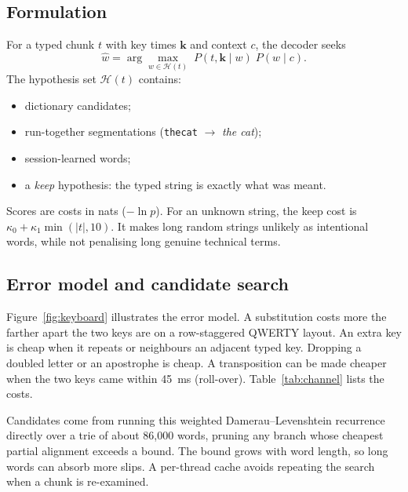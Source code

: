 \documentclass[11pt,a4paper]{article}
\newcommand{\ttw}[1]{\texttt{#1}}
\begin{document}
\subsection{Formulation}
For a typed chunk $t$ with key times $\mathbf{k}$ and context $c$, the decoder seeks
\begin{equation}
\hat{w} = \arg\max_{w \in \mathcal{H}(t)} \; P(t,\mathbf{k}\mid w)\; P(w \mid c).
\end{equation}
The hypothesis set $\mathcal{H}(t)$ contains:
\begin{itemize}
\item dictionary candidates;
\item run-together segmentations (\ttw{thecat} $\to$ \emph{the cat});
\item session-learned words;
\item a \emph{keep} hypothesis: the typed string is exactly what was meant.
\end{itemize}
Scores are costs in nats ($-\ln p$). For an unknown string, the keep cost is $\kappa_0 + \kappa_1\min(|t|,10)$. It makes long random strings unlikely as intentional words, while not penalising long genuine technical terms.

\subsection{Error model and candidate search}
Figure~\ref{fig:keyboard} illustrates the error model. A substitution costs more the farther apart the two keys are on a row-staggered QWERTY layout. An extra key is cheap when it repeats or neighbours an adjacent typed key. Dropping a doubled letter or an apostrophe is cheap. A transposition can be made cheaper when the two keys came within 45~ms (roll-over). Table~\ref{tab:channel} lists the costs.

Candidates come from running this weighted Damerau--Levenshtein recurrence directly over a trie of about 86,000 words, pruning any branch whose cheapest partial alignment exceeds a bound. The bound grows with word length, so long words can absorb more slips. A per-thread cache avoids repeating the search when a chunk is re-examined.
\end{document}
